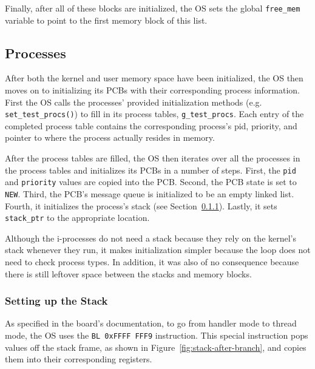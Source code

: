 \documentclass[se]{uw-wkrpt}
\begin{document}
Finally, after all of these blocks are initialized, the OS sets the global \texttt{free\_mem} variable to point to the first memory block of this list. 

\subsection{Processes}
After both the kernel and user memory space have been initialized, the OS then moves on to initializing its PCBs with their corresponding process information. First the OS calls the processes' provided initialization methods (e.g. \texttt{set\_test\_procs()}) to fill in its process tables, \texttt{g\_test\_procs}. Each entry of the completed process table contains the corresponding process's pid, priority, and pointer to where the process actually resides in memory. 

After the process tables are filled, the OS then iterates over all the processes in the process tables and initializes its PCBs in a number of steps. First, the \texttt{pid} and \texttt{priority} values are copied into the PCB. Second, the PCB state is set to \texttt{NEW}. Third, the PCB's message queue is initialized to be an empty linked list. Fourth, it initializes the process's stack (see Section~\ref{sec:setting-up-stack}). Lastly, it sets \texttt{stack\_ptr} to the appropriate location.
	
Although the i-processes do not need a stack because they rely on the kernel's stack whenever they run, it makes initialization simpler because the loop does not need to check process types. In addition, it was also of no consequence because there is still leftover space between the stacks and memory blocks.

\subsubsection{Setting up the Stack} \label{sec:setting-up-stack}

As specified in the board's documentation, to go from handler mode to thread mode, the OS uses the \texttt{BL 0xFFFF FFF9} instruction. This special instruction pops values off the stack frame, as shown in Figure~\ref{fig:stack-after-branch}, and copies them into their corresponding registers.
	
\end{document}
